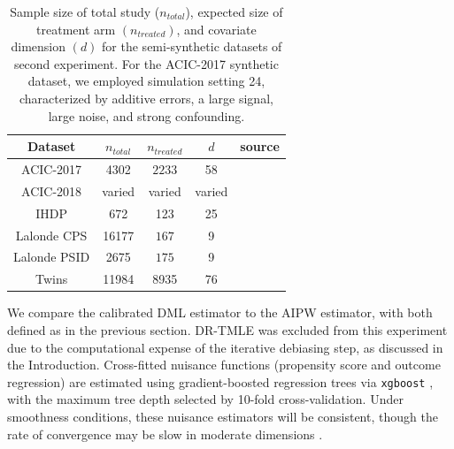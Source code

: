 \documentclass[11pt]{article}
\theoremstyle{plain}
\begin{document}
\begin{table}[tb]
\centering
\footnotesize
\caption{Sample size of total study ($n_{total}$), expected size of treatment arm $(n_{treated})$, and covariate dimension $(d)$ for the semi-synthetic datasets of second experiment. For the ACIC-2017 synthetic dataset, we employed simulation setting 24, characterized by additive errors, a large signal, large noise, and strong confounding.}
\label{tab:dataset_summary}
\begin{tabular}{|c|c|c|c|c|}
\hline 
Dataset & $n_{total}$ & $n_{treated}$ & $d$ &  source\\
\hline
\hline
ACIC-2017  & 4302 & $2233$ &  58 & \cite{hahn2019atlantic}\\
\hline
ACIC-2018  & varied & varied &  varied & \cite{shimoni2018benchmarking}\\
\hline
IHDP & 672 & 123 &  25 & \cite{shalit2017estimating}\\
\hline
Lalonde CPS & 16177 & $167$ & 9 & \cite{neal2020realcause} \\
\hline
Lalonde PSID & 2675 & $175$ &  9 & \cite{neal2020realcause}\\
\hline
Twins & 11984 & 8935 &  76 & \cite{neal2020realcause}\\
\hline  
\end{tabular}
\end{table}

We compare the calibrated DML estimator to the AIPW estimator, with both defined as in the previous section. DR-TMLE was excluded from this experiment due to the computational expense of the iterative debiasing step, as discussed in the Introduction. Cross-fitted nuisance functions (propensity score and outcome regression) are estimated using gradient-boosted regression trees via \texttt{xgboost} \citep{chen2015xgboost}, with the maximum tree depth selected by 10-fold cross-validation. Under smoothness conditions, these nuisance estimators will be consistent, though the rate of convergence may be slow in moderate dimensions \citep{zhang2005boosting}.

 



\end{document}
